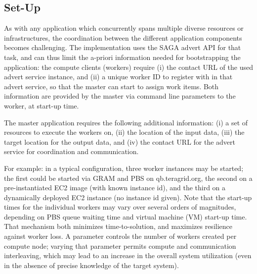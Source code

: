 \documentclass[3p,twocolumn]{elsarticle}
\begin{document}
\subsection{\sagamapreduce Set-Up}

As with any application which concurrently spans multiple diverse
resources or infrastructures, the coordination between the different
application components becomes challenging.  The \smr implementation
uses the SAGA advert API for that task, and can thus limit the a-priori
information needed for bootstrapping the application: the compute
clients (workers) require (i) the contact URL of the used advert
service instance, and (ii) a unique worker ID to register with in that
advert service, so that the master can start to assign work items.
Both information are provided by the master via command line
parameters to the worker, at start-up time.

The master application requires the following additional information:
(i) a set of resources to execute the workers on, (ii) the
location of the input data, (iii) the target location for the output
data, and (iv) the contact URL for the advert service for
coordination and communication.

For example: in a typical configuration, three worker instances may be
started; the first could be started via GRAM and PBS on
qb.teragrid.org, the second on a pre-instantiated EC2 image (with
known instance id), and the third on a dynamically deployed EC2
instance (no instance id given).  Note that the start-up times for the
individual workers may vary over several orders of magnitudes,
depending on PBS queue waiting time and virtual machine (VM) start-up
time.  That mechanism both minimizes time-to-solution, and maximizes
resilience against worker loss.
%
%
A parameter controls the number of workers created per compute node;
varying that parameter permits compute and communication interleaving,
which may lead to an increase in the overall system utilization (even
in the absence of precise knowledge of the target system).
\end{document}

